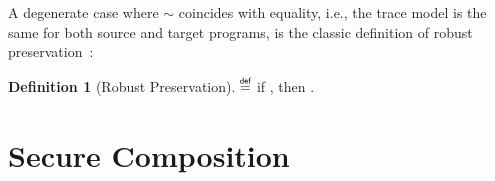 \documentclass[dvipsnames,conference]{IEEEtran}
\theoremstyle{definition}
\newtheorem{definition}{Definition}[section]
\begin{document}
A degenerate case where $\sim$ coincides with equality, i.e., the trace model is the same for both source and target programs, is the classic definition of robust preservation~\cite{abate2019jour}:

\begin{definition}[Robust Preservation]\label{def:rtp}
  $\isdef$
   if \iul{$\rsat{\src{\progvar}}{\pi}$}, then .
\end{definition}

\section{Secure Composition}\label{sec:sequential}
\end{document}
